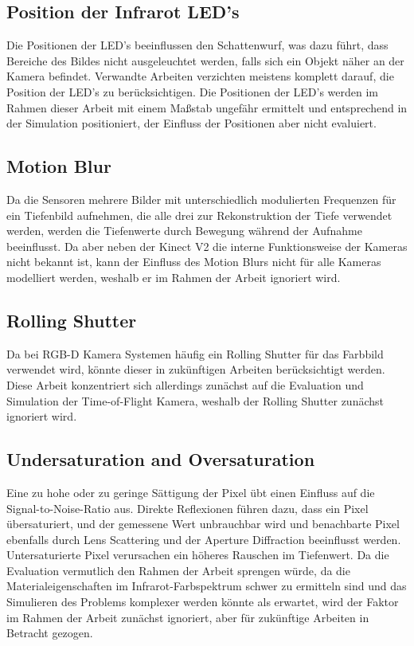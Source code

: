 \documentclass[thesis.tex]{subfiles}
\begin{document}
\subsection{Position der Infrarot LED's}

Die Positionen der LED's beeinflussen den Schattenwurf, was dazu führt, dass Bereiche des Bildes nicht ausgeleuchtet werden, falls sich ein Objekt näher an der Kamera befindet. Verwandte Arbeiten verzichten meistens komplett darauf, die Position der LED's zu berücksichtigen. Die Positionen der LED's werden im Rahmen dieser Arbeit mit einem Maßstab ungefähr ermittelt und entsprechend in der Simulation positioniert, der Einfluss der Positionen aber nicht evaluiert.

\subsection{Motion Blur}

Da die Sensoren mehrere Bilder mit unterschiedlich modulierten Frequenzen für ein Tiefenbild aufnehmen, die alle drei zur Rekonstruktion der Tiefe verwendet werden, werden die Tiefenwerte durch Bewegung während der Aufnahme beeinflusst. Da aber neben der Kinect V2 die interne Funktionsweise der Kameras nicht bekannt ist, kann der Einfluss des Motion Blurs nicht für alle Kameras modelliert werden, weshalb er im Rahmen der Arbeit ignoriert wird.

\subsection{Rolling Shutter}

Da bei RGB-D Kamera Systemen häufig ein Rolling Shutter für das Farbbild verwendet wird, könnte dieser in zukünftigen Arbeiten berücksichtigt werden. Diese Arbeit konzentriert sich allerdings zunächst auf die Evaluation und Simulation der Time-of-Flight Kamera, weshalb der Rolling Shutter zunächst ignoriert wird.

\subsection{Undersaturation and Oversaturation}

Eine zu hohe oder zu geringe Sättigung der Pixel übt einen Einfluss auf die Signal-to-Noise-Ratio aus. Direkte Reflexionen führen dazu, dass ein Pixel übersaturiert, und der gemessene Wert unbrauchbar wird und benachbarte Pixel ebenfalls durch Lens Scattering und der Aperture Diffraction beeinflusst werden. Untersaturierte Pixel verursachen ein höheres Rauschen im Tiefenwert. Da die Evaluation vermutlich den Rahmen der Arbeit sprengen würde, da die Materialeigenschaften im Infrarot-Farbspektrum schwer zu ermitteln sind und das Simulieren des Problems komplexer werden könnte als erwartet, wird der Faktor im Rahmen der Arbeit zunächst ignoriert, aber für zukünftige Arbeiten in Betracht gezogen.
\end{document}
